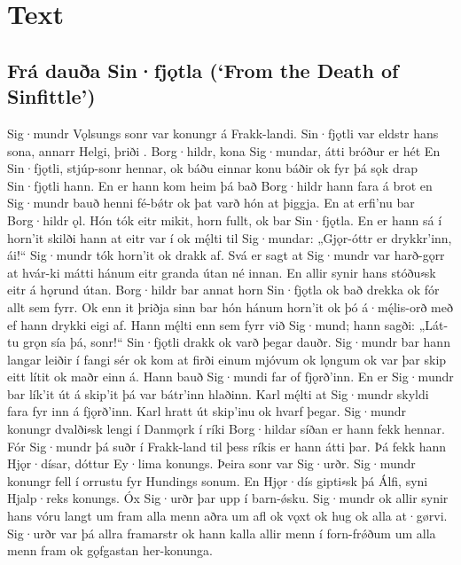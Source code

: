 \newpage

\section{Text}

\subsection{Frá dauða Sin·fjǫtla (‘From the Death of Sinfittle’)}

\sectionline

\bpg\bpa Sig·mundr Vǫlsungs sonr var konungr á Frakk-landi.  Sin·fjǫtli var eldstr hans sona, annarr Helgi, þriði .  Borg·hildr, kona Sig·mundar, átti bróður er hét   En Sin·fjǫtli, stjúp-sonr hennar, ok  báðu einnar konu báðir ok fyr þá sǫk drap Sin·fjǫtli hann.  En er hann kom heim þá bað Borg·hildr hann fara á brot en Sig·mundr bauð henni fé-bǿtr ok þat varð hón at þiggja.  En at erfi’nu bar Borg·hildr ǫl.  Hón tók eitr mikit, horn fullt, ok bar Sin·fjǫtla.  En er hann sá í horn’it skilði hann at eitr var í ok mę́lti til Sig·mundar: „Gjǫr-óttr er drykkr’inn, ái!“  Sig·mundr tók horn’it ok drakk af.  Svá er sagt at Sig·mundr var harð-gǫrr at hvár-ki mátti hánum eitr granda útan né innan.  En allir synir hans stóðu⸗sk eitr á hǫrund útan.  Borg·hildr bar annat horn Sin·fjǫtla ok bað drekka ok fór allt sem fyrr.  Ok enn it þriðja sinn bar hón hánum horn’it ok þó á·mę́lis-orð með ef hann drykki eigi af.  Hann mę́lti enn sem fyrr við Sig·mund; hann sagði: „Lát-tu grǫn sía þá, sonr!“  Sin·fjǫtli drakk ok varð þegar dauðr.
Sig·mundr bar hann langar leiðir í fangi sér ok kom at firði einum mjóvum ok lǫngum ok var þar skip eitt lítit ok maðr einn á.  Hann bauð Sig·mundi far of fjǫrð’inn.  En er Sig·mundr bar lík’it út á skip’it þá var bátr’inn hlaðinn.  Karl mę́lti at Sig·mundr skyldi fara fyr inn á fjǫrð’inn.  Karl hratt út skip’inu ok hvarf þegar.
Sig·mundr konungr dvalði⸗sk lengi í Danmǫrk í ríki Borg·hildar síðan er hann fekk hennar.  Fór Sig·mundr þá suðr í Frakk-land til þess ríkis er hann átti þar.  Þá fekk hann Hjǫr·dísar, dóttur Ey·lima konungs.  Þeira sonr var Sig·urðr.  Sig·mundr konungr fell í orrustu fyr Hundings sonum.  En Hjǫr·dís gipti⸗sk þá Álfi, syni Hjalp·reks konungs.  Óx Sig·urðr þar upp í barn-ǿsku.  Sig·mundr ok allir synir hans vóru langt um fram alla menn aðra um afl ok vǫxt ok hug ok alla at·gørvi.  Sig·urðr var þá allra framarstr ok hann kalla allir menn í forn-frǿðum um alla menn fram ok gǫfgastan her-konunga.\epa

